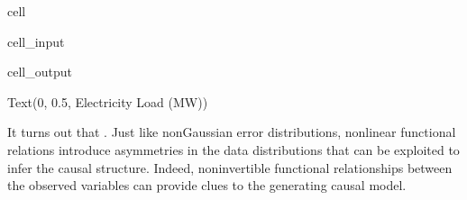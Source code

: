 \documentclass[letterpaper,10pt,english]{jupyterBook}
\begin{document}
\begin{sphinxuseclass}{cell}
\begin{sphinxVerbatimInput}
\begin{sphinxuseclass}{cell_input}
\begin{sphinxVerbatim}[commandchars=\\\{\}]
  \PYG{p}{[}\PYG{p}{]} \PYG{p}{[}\PYG{p}{]}   
\end{sphinxVerbatim}

\end{sphinxuseclass}\end{sphinxVerbatimInput}
\begin{sphinxVerbatimOutput}

\begin{sphinxuseclass}{cell_output}
\begin{sphinxVerbatim}[commandchars=\\\{\}]
Text(0, 0.5, \PYGZsq{}Electricity Load (MW)\PYGZsq{})
\end{sphinxVerbatim}

\noindent{}

\end{sphinxuseclass}\end{sphinxVerbatimOutput}

\end{sphinxuseclass}
\sphinxAtStartPar
It turns out that . Just like non\sphinxhyphen{}Gaussian error distributions, nonlinear functional relations introduce asymmetries in the data distributions that can be exploited to infer the causal structure. Indeed, non\sphinxhyphen{}invertible functional relationships between the observed variables can provide clues to the generating causal model.
\end{document}
